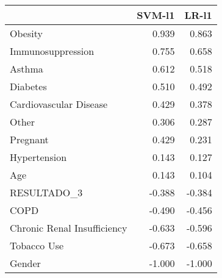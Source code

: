\begin{tabular}{lrr}
\toprule
{} &  SVM-l1 &  LR-l1 \\
\midrule
Obesity                     &   0.939 &  0.863 \\
Immunosuppression           &   0.755 &  0.658 \\
Asthma                      &   0.612 &  0.518 \\
Diabetes                    &   0.510 &  0.492 \\
Cardiovascular Disease      &   0.429 &  0.378 \\
Other                       &   0.306 &  0.287 \\
Pregnant                    &   0.429 &  0.231 \\
Hypertension                &   0.143 &  0.127 \\
Age                         &   0.143 &  0.104 \\
RESULTADO\_3                 &  -0.388 & -0.384 \\
COPD                        &  -0.490 & -0.456 \\
Chronic Renal Insufficiency &  -0.633 & -0.596 \\
Tobacco Use                 &  -0.673 & -0.658 \\
Gender                      &  -1.000 & -1.000 \\
\bottomrule
\end{tabular}
